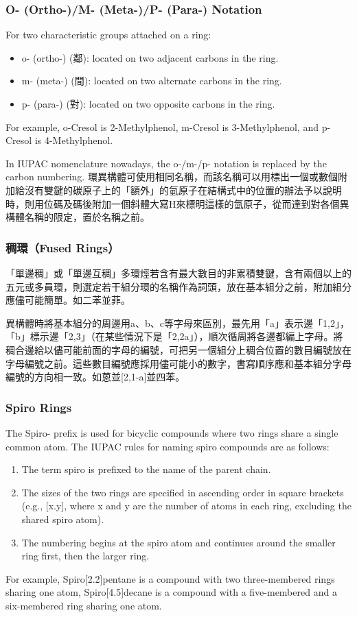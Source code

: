 \documentclass[a4paper,12pt]{report}
\begin{document}
\subsubsection{O- (Ortho-)/M- (Meta-)/P- (Para-) Notation}
For two characteristic groups attached on a ring:
\begin{itemize}
\item o- (ortho-) (鄰): located on two adjacent carbons in the ring.
\item m- (meta-) (間): located on two alternate carbons in the ring.
\item p- (para-) (對): located on two opposite carbons in the ring.
\end{itemize}
For example, o-Cresol is 2-Methylphenol, m-Cresol is 3-Methylphenol, and p-Cresol is 4-Methylphenol. 

In IUPAC nomenclature nowadays, the o-/m-/p- notation is replaced by the carbon numbering.
環異構體可使用相同名稱，而該名稱可以用標出一個或數個附加給沒有雙鍵的碳原子上的「額外」的氫原子在結構式中的位置的辦法予以說明時，則用位碼及碼後附加一個斜體大寫H來標明這樣的氫原子，從而達到對各個異構體名稱的限定，置於名稱之前。
\subsubsection{稠環（Fused Rings）}
\bit
\item 「單邊稠」或「單邊互稠」多環烴若含有最大數目的非累積雙鍵，含有兩個以上的五元或多員環，則選定若干組分環的名稱作為詞頭，放在基本組分之前，附加組分應儘可能簡單。如二苯並菲。
\item 異構體時將基本組分的周邊用a、b、c等字母來區別，最先用「a」表示邊「1,2」，「b」標示邊「2,3」（在某些情況下是「2,2a」），順次循周將各邊都編上字母。將稠合邊給以儘可能前面的字母的編號，可把另一個組分上稠合位置的數目編號放在字母編號之前。這些數目編號應採用儘可能小的數字，書寫順序應和基本組分字母編號的方向相一致。如蒽並[2,1-a]並四苯。
\eit
\subsubsection{Spiro Rings}
The Spiro- prefix is used for bicyclic compounds where two rings share a single common atom. The IUPAC rules for naming spiro compounds are as follows:
\begin{enumerate}
\item The term spiro is prefixed to the name of the parent chain.
\item The sizes of the two rings are specified in ascending order in square brackets (e.g., [x.y], where x and y are the number of atoms in each ring, excluding the shared spiro atom).
\item The numbering begins at the spiro atom and continues around the smaller ring first, then the larger ring.
\end{enumerate}
For example, Spiro[2.2]pentane is a compound with two three-membered rings sharing one atom, Spiro[4.5]decane is a compound with a five-membered and a six-membered ring sharing one atom.
\end{document}
